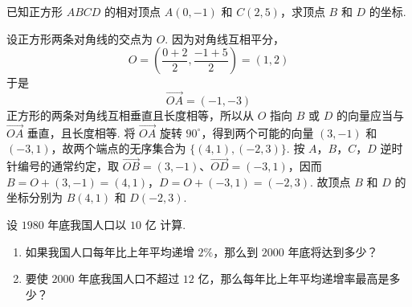 \begin{problem}
已知正方形 \(ABCD\) 的相对顶点 \(A(0,-1)\) 和 \(C(2,5)\)，求顶点 \(B\) 和 \(D\) 的坐标.
\end{problem}

\begin{solution}
设正方形两条对角线的交点为 \(O\). 因为对角线互相平分，
\[
O=\left(\frac{0+2}{2},\frac{-1+5}{2}\right)=(1,2)
\]
于是
\[
\overrightarrow{OA}=(-1,-3)
\]
正方形的两条对角线互相垂直且长度相等，所以从 \(O\) 指向 \(B\) 或 \(D\) 的向量应当与 \(\overrightarrow{OA}\) 垂直，且长度相等. 将 \(\overrightarrow{OA}\) 旋转 \(90^{\circ}\)，得到两个可能的向量 \((3,-1)\) 和 \((-3,1)\)，故两个端点的无序集合为 \(\{(4,1),(-2,3)\}\). 按 \(A\)，\(B\)，\(C\)，\(D\) 逆时针编号的通常约定，取 \(\overrightarrow{OB}=(3,-1)\)、\(\overrightarrow{OD}=(-3,1)\)，因而
\(B=O+(3,-1)=(4,1)\)，\(D=O+(-3,1)=(-2,3)\).
故顶点 \(B\) 和 \(D\) 的坐标分别为 \(B(4,1)\) 和 \(D(-2,3)\).
\end{solution}

\begin{problem}
设 \(1980\) 年底我国人口以 \(10\text{ 亿}\) 计算.

\begin{enumerate}
\item 如果我国人口每年比上年平均递增 \(2\%\)，那么到 \(2000\) 年底将达到多少？
\item 要使 \(2000\) 年底我国人口不超过 \(12\text{ 亿}\)，那么每年比上年平均递增率最高是多少？
\end{enumerate}

\begin{center}
\end{center}
\end{problem}


